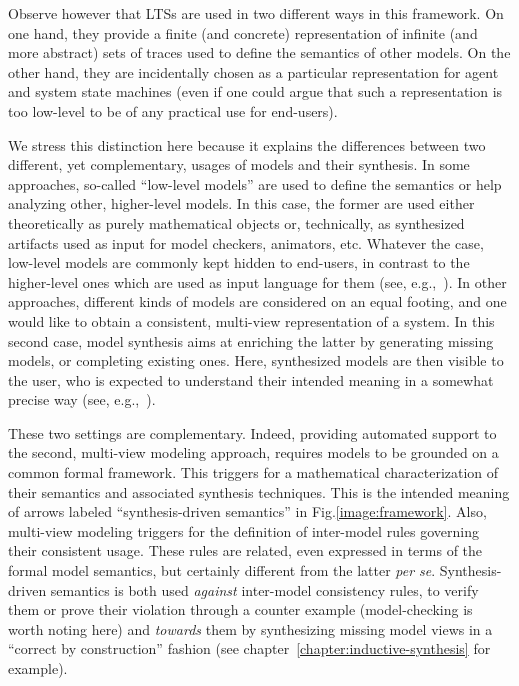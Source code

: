 Observe however that LTSs are used in two different ways in this framework. On one hand, they provide a finite (and concrete) representation of infinite (and more abstract) sets of traces used to define the semantics of other models. On the other hand, they are incidentally chosen as a particular representation for agent and system state machines (even if one could argue that such a representation is too low-level to be of any practical use for end-users). 

We stress this distinction here because it explains the differences between two different, yet complementary, usages of models and their synthesis. In some approaches, so-called ``low-level models'' are used to define the semantics or help analyzing other, higher-level models. In this case, the former are used either theoretically as purely mathematical objects or, technically, as synthesized artifacts used as input for model checkers, animators, etc. Whatever the case, low-level models are commonly kept hidden to end-users, in contrast to the higher-level ones which are used as input language for them (see, e.g.,~\cite{Magee:1997, Uchitel:2003, Damas:2009}). In other approaches, different kinds of models are considered on an equal footing, and one would like to obtain a consistent, multi-view representation of a system. In this second case, model synthesis aims at enriching the latter by generating missing models, or completing existing ones. Here, synthesized models are then visible to the user, who is expected to understand their intended meaning in a somewhat precise way (see, e.g.,~\cite{VanLamsweerde:1998, Whittle:2000, Uchitel:2004, Damas:2005}).

These two settings are complementary. Indeed, providing automated support to the second, multi-view modeling approach, requires models to be grounded on a common formal framework. This triggers for a mathematical characterization of their semantics and associated synthesis techniques. This is the intended meaning of arrows labeled ``synthesis-driven semantics'' in Fig.\ref{image:framework}. Also, multi-view modeling triggers for the definition of inter-model rules governing their consistent usage. These rules are related, even expressed in terms of the formal model semantics, but certainly different from the latter \emph{per se}. Synthesis-driven semantics is both used \emph{against} inter-model consistency rules, to verify them or prove their violation through a counter example (model-checking is worth noting here) and \emph{towards} them by synthesizing missing model views in a ``correct by construction'' fashion (see chapter~\ref{chapter:inductive-synthesis} for example).

